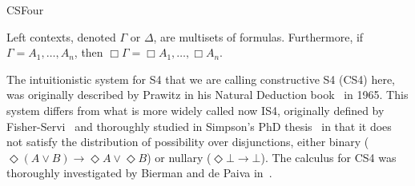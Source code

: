 \begin{entry}{CSFour}
\begin{calculus}
\end{calculus}

\begin{clarifications}
  Left contexts, denoted $\Gamma$ or $\Delta$, are multisets of
  formulas. Furthermore, if $\Gamma = A_1,\ldots,A_n$, then
  $\Box \Gamma = \Box A_1,\ldots,\Box A_n$.
\end{clarifications}

\begin{history}
 The intuitionistic system for S4 that we are calling constructive S4
 (CS4) here, was originally described by Prawitz in his Natural
 Deduction book~\cite{prawitznatural} in 1965. This system differs from
 what is more widely called now IS4, originally defined by
 Fisher-Servi~\cite{Fisher-Servi:1981} and thoroughly studied in
 Simpson's PhD thesis~\cite{simpson1994phd} in that it does not
 satisfy the distribution of possibility over disjunctions, either
 binary ($\Diamond (A\lor B) \to \Diamond A \lor \Diamond B$) or
 nullary ($\Diamond \bot \to \bot$). The calculus for CS4 was
 thoroughly investigated by Bierman and de Paiva
 in~\cite{bierman2000}.
\end{history}

\end{entry}
